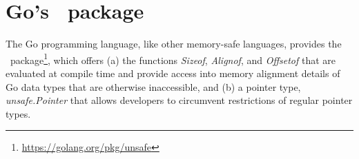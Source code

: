 \section{Go's \unsafe{}~package}
\label{sec:background}



The Go programming language, like other memory-safe languages, provides the \unsafe{}~package\footnote{\url{https://golang.org/pkg/unsafe}}, which offers 
(a) the functions \textit{Sizeof}, \textit{Alignof}, and \textit{Offsetof} that are evaluated at compile time and provide access into memory alignment details of Go data types that are otherwise inaccessible, %
and (b) a pointer type, \textit{unsafe.Pointer} that allows developers to circumvent restrictions of regular pointer types.

